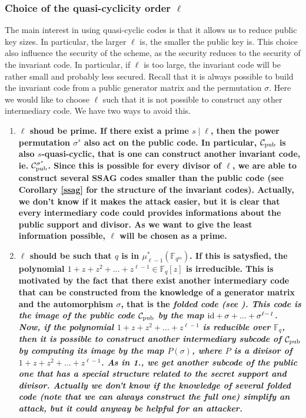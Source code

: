 \documentclass[10pt]{article}
\newcommand{\s}{\vspace{0.3cm}}
\newcommand{\C}{\mathcal{C}}
\newcommand{\fqm}{\mathbb{F}_{q^m}}
\newcommand{\fq}{\mathbb{F}_q}
\begin{document}
\s

\subsubsection{Choice of the quasi-cyclicity order $\ell$}

\s

The main interest in using quasi-cyclic codes is that it allows us to reduce public key sizes. In particular, the larger $\ell$ is, the smaller the public key is. This choice also influence the security of the scheme, as the security reduces to the security of the invariant code. In particular, if $\ell$ is too large, the invariant code will be rather small and probably less secured. Recall that it is always possible to build the invariant code from a public generator matrix and the permutation $\sigma$. Here we would like to choose $\ell$ such that it is not possible to construct any other intermediary code. We have two ways to avoid this.

\s

\begin{enumerate}
\item \bf{$\ell$ shoud be prime}. \rm If there exist a prime $s \mid \ell$, then the power permutation $\sigma^s$ also act on the public code. In particular, $\C_{\rm pub}$ is also $s$-quasi-cyclic, that is one can construct another invariant code, ie. $\C_{\rm pub}^{\sigma^s}$. Since this is possible for every divisor of $\ell$, we are able to construct several SSAG codes smaller than the public code (see Corollary \ref{ssag} for the structure of the invariant codes). Actually, we don't know if it makes the attack easier, but it is clear that every intermediary code could provides informations about the public support and divisor. As we want to give the least information possible, $\ell$ will be chosen as a prime.

\item \bf{$\ell$ should be such that $q$ is in $\mu_{\ell -1}^*(\fqm)$}. \rm If this is satysfied, the polynomial $1+z+z^2+...+z^{\ell-1} \in \fq[z]$ is irreducible. This is motivated by the fact that there exist another intermediary code that can be constructed from the knowledge of a generator matrix and the automorphism $\sigma$, that is the \it{folded code} \rm (see \cite{FOP}). This code is the image of the public code $\C_{\rm pub}$ by the map $\rm id \it +\sigma+...+\sigma^{\ell-1}$. Now, if the polynomial $1+z+z^2+...+z^{\ell-1}$ is reducible over $\fq$, then it is possible to construct another intermediary subcode of $\C_{\rm pub}$ by computing its image by the map $P(\sigma)$, where $P$ is a divisor of $1+z+z^2+...+z^{\ell-1}$. As in 1., we get another subcode of the public one that has a special structure related to the secret support and divisor. Actually we don't know if the knowledge of several folded code (note that we can always construct the full one) simplify an attack, but it could anyway be helpful for an attacker.
\end{enumerate}
\end{document}
